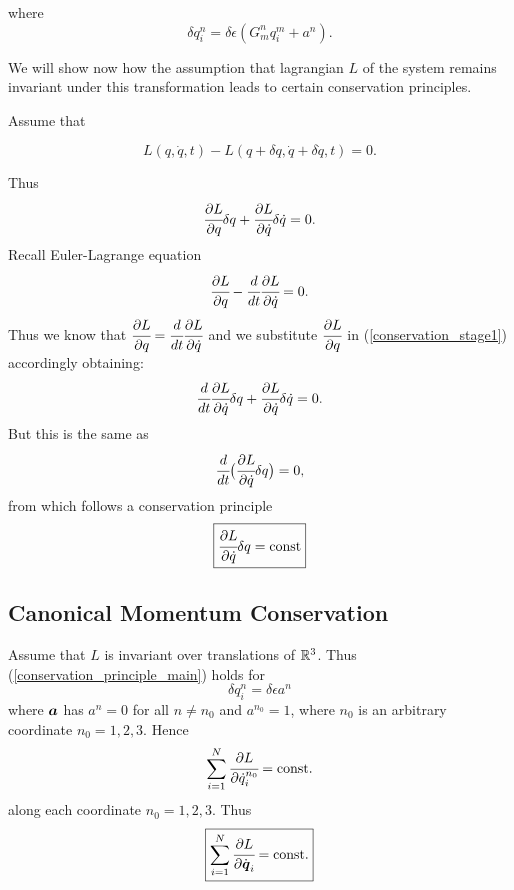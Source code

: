 \documentclass[main.tex]{subfiles}
\begin{document}
where 
\begin{equation}
\delta q^n_i = \delta\epsilon(G^n_m q^m_i + a^n).
\end{equation}

We will show now how the assumption that lagrangian $L$ of the system remains invariant under this transformation leads to certain conservation principles.

Assume that 

\begin{equation}
L(q, \dot{q}, t) - L(q + \delta q, \dot{q} + \delta \dot{q}, t) = 0.
\end{equation}

Thus
\begin{equation}
\label{conservation_stage1}
\cfrac{\partial L}{\partial q}\delta q + \cfrac{\partial L}{\partial \dot{q}}\delta \dot{q} = 0. 
\end{equation}
Recall Euler-Lagrange equation
\begin{equation}
\label{lagrange_equation3}
\cfrac{\partial L}{\partial q} - \cfrac{d}{dt}\cfrac{\partial L}{\partial \dot{q}} = 0.
\end{equation}
Thus we know that $\cfrac{\partial L}{\partial q} = \cfrac{d}{dt}\cfrac{\partial L}{\partial \dot{q}}$ and we substitute $\cfrac{\partial L}{\partial q}$ in (\ref{conservation_stage1}) accordingly obtaining:
\begin{equation}
\cfrac{d}{dt}\cfrac{\partial L}{\partial \dot{q}}\delta q + \cfrac{\partial L}{\partial \dot{q}}\delta \dot{q} = 0. 
\end{equation}
But this is the same as
\begin{equation}
\cfrac{d}{dt}\big( \cfrac{\partial L}{\partial \dot{q}}\delta q \big) = 0,
\end{equation}
from which follows a conservation principle
\begin{equation}
\label{conservation_principle_main}
\boxed{
 \cfrac{\partial L}{\partial \dot{q}}\delta q = \text{const}
 }
\end{equation}
\subsection{Canonical Momentum Conservation}
Assume that $L$ is invariant over translations of $\mathbb{R}^3$. Thus (\ref{conservation_principle_main}) holds for
\begin{equation}
\delta q^{n}_i = \delta\epsilon a^{n}
\end{equation}
where $\boldsymbol{a}$ has $a^n = 0$ for all $n\not=n_0$ and $a^{n_0} = 1$, where $n_0$ is an arbitrary coordinate $n_0 = 1, 2, 3$.
Hence
\begin{equation}
\sum_{i=1}^{N} \cfrac{\partial L}{\partial \dot{q}^{n_0}_i} = \text{const}.
\end{equation}
along each coordinate $n_0 = 1, 2, 3$. Thus
\begin{equation}
\boxed{
\sum_{i=1}^{N} \cfrac{\partial L}{\partial \dot{\boldsymbol{q}}_i} = \text{const}.
}
\end{equation}
\end{document}
